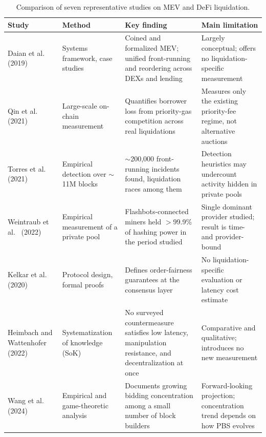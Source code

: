\documentclass{llncs}
\begin{document}
\begin{table}[h]
\caption{Comparison of seven representative studies on MEV and DeFi liquidation.}
\label{tab:litreview}
\centering
\renewcommand{\arraystretch}{1.25}
\begin{tabular}{p{2.0cm}p{2.6cm}p{3.9cm}p{3.5cm}}
\toprule
\textbf{Study} & \textbf{Method} & \textbf{Key finding} & \textbf{Main limitation} \\
\midrule
Daian et al.~\cite{daian2019flash} (2019) &
Systems framework, case studies &
Coined and formalized MEV; unified front-running and reordering across DEXs and lending &
Largely conceptual; offers no liquidation-specific measurement \\
Qin et al.~\cite{qin2021empirical} (2021) &
Large-scale on-chain measurement &
Quantifies borrower loss from priority-gas competition across real liquidations &
Measures only the existing priority-fee regime, not alternative auctions \\
Torres et al.~\cite{torres2021frontrunner} (2021) &
Empirical detection over $\sim$11M blocks &
$\sim$200{,}000 front-running incidents found, liquidation races among them &
Detection heuristics may undercount activity hidden in private pools \\
Weintraub et al.~\cite{weintraub2022flashbot} (2022) &
Empirical measurement of a private pool &
Flashbots-connected miners held $>$99.9\% of hashing power in the period studied &
Single dominant provider studied; result is time- and provider-bound \\
Kelkar et al.~\cite{kelkar2020order} (2020) &
Protocol design, formal proofs &
Defines order-fairness guarantees at the consensus layer &
No liquidation-specific evaluation or latency cost estimate \\
Heimbach and Wattenhofer~\cite{heimbach2022sok} (2022) &
Systematization of knowledge (SoK) &
No surveyed countermeasure satisfies low latency, manipulation resistance, and decentralization at once &
Comparative and qualitative; introduces no new measurement \\
Wang et al.~\cite{wang2024private} (2024) &
Empirical and game-theoretic analysis &
Documents growing bidding concentration among a small number of block builders &
Forward-looking projection; concentration trend depends on how PBS evolves \\
\bottomrule
\end{tabular}
\end{table}
\end{document}
